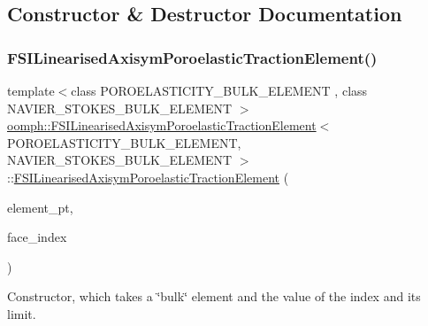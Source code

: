 \subsection{Constructor \& Destructor Documentation}
\mbox{\label{classoomph_1_1FSILinearisedAxisymPoroelasticTractionElement_a476bd52349df91ba7a89ebbe1f9891a7}} 
\subsubsection{\texorpdfstring{F\+S\+I\+Linearised\+Axisym\+Poroelastic\+Traction\+Element()}{FSILinearisedAxisymPoroelasticTractionElement()}\hspace{0.1cm}{\footnotesize\ttfamily [1/2]}}
{\footnotesize\ttfamily template$<$class P\+O\+R\+O\+E\+L\+A\+S\+T\+I\+C\+I\+T\+Y\+\_\+\+B\+U\+L\+K\+\_\+\+E\+L\+E\+M\+E\+NT , class N\+A\+V\+I\+E\+R\+\_\+\+S\+T\+O\+K\+E\+S\+\_\+\+B\+U\+L\+K\+\_\+\+E\+L\+E\+M\+E\+NT $>$ \\
\hyperlink{classoomph_1_1FSILinearisedAxisymPoroelasticTractionElement}{oomph\+::\+F\+S\+I\+Linearised\+Axisym\+Poroelastic\+Traction\+Element}$<$ P\+O\+R\+O\+E\+L\+A\+S\+T\+I\+C\+I\+T\+Y\+\_\+\+B\+U\+L\+K\+\_\+\+E\+L\+E\+M\+E\+NT, N\+A\+V\+I\+E\+R\+\_\+\+S\+T\+O\+K\+E\+S\+\_\+\+B\+U\+L\+K\+\_\+\+E\+L\+E\+M\+E\+NT $>$\+::\hyperlink{classoomph_1_1FSILinearisedAxisymPoroelasticTractionElement}{F\+S\+I\+Linearised\+Axisym\+Poroelastic\+Traction\+Element} (\begin{DoxyParamCaption}\item[{\hyperlink{classoomph_1_1FiniteElement}{Finite\+Element} $\ast$const \&}]{element\+\_\+pt,  }\item[{const int \&}]{face\+\_\+index }\end{DoxyParamCaption})\hspace{0.3cm}{\ttfamily [inline]}}



Constructor, which takes a \char`\"{}bulk\char`\"{} element and the value of the index and its limit. 



